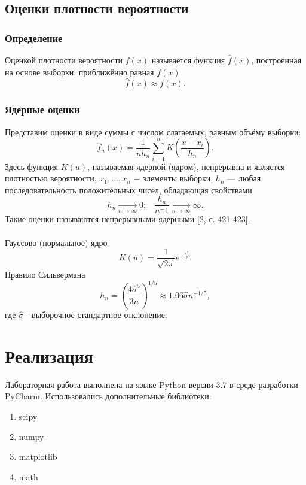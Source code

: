 \documentclass[a4paper]{article}
\begin{document}
	\subsection{Оценки плотности вероятности}
	\subsubsection{Определение}
	\noindent Оценкой плотности вероятности $f(x)$ называется функция $\widehat{f}(x)$, построенная на основе выборки, приближённо равная $f(x)$
    \begin{equation}
        \widehat{f}(x)\approx f(x).
    \end{equation}
	\subsubsection{Ядерные оценки}
	\noindent Представим оценки в виде суммы с числом слагаемых, равным объёму выборки:\begin{equation}
        \widehat{f}_n(x)=\frac{1}{n h_n}\sum_{i=1}^n K\left(\frac{x-x_i}{h_n}\right).
    \end{equation}
    Здесь функция $K(u)$, называемая ядерной (ядром), непрерывна и является плотностью вероятности, $x_1,...,x_n$ $-$ элементы выборки, ${h_n}$ — любая последовательность положительных чисел, обладающая свойствами
    \begin{equation}
        h_n\xrightarrow[n\to\infty]{}0;\;\;\;\frac{h_n}{n^-1} \xrightarrow[n\to\infty]{}\infty.
    \end{equation}
    Такие оценки называются непрерывными ядерными [2, с. 421-423].\\\\
    Гауссово (нормальное) ядро
    \begin{equation}
        K(u)=\frac{1}{\sqrt{2\pi}}e^{-\frac{u^2}{2}}.
    \end{equation}
    Правило Сильвермана
    \begin{equation}
        h_n=\left(\frac{4\hat{\sigma}^5}{3n}\right)^{1/5}\approx1.06\hat{\sigma}n^{-1/5},
    \end{equation}
    где $\hat{\sigma}$ - выборочное стандартное отклонение.
\section {Реализация} 	
\noindent Лабораторная работа выполнена на языке Python версии 3.7 в среде разработки PyCharm. Использовались дополнительные библиотеки:
\begin{enumerate}
    \item scipy
    \item numpy
    \item matplotlib
    \item math
\end{enumerate}
\end{document}
